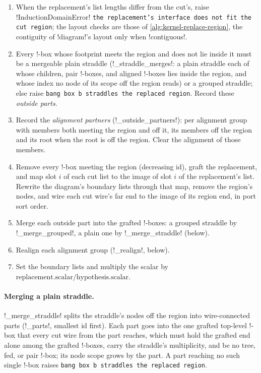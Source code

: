 \begin{algorithm}\label{alg:kernel-replace-cut}
\begin{enumerate}
\item When the replacement's list lengths differ from the cut's, raise \py!InductionDomainError! \texttt{the replacement's interface does not fit the cut region}; the layout checks are those of \cref{alg:kernel-replace-region}, the contiguity of \code!diagram!'s layout only when \code!contiguous!.
\item Every !-box whose footprint meets the region and does not lie inside it must be a mergeable plain straddle (\py!_straddle_merges!: a plain straddle each of whose children, pair !-boxes, and aligned !-boxes lies inside the region, and whose index no node of its scope off the region reads) or a grouped straddle; else raise \texttt{bang box b straddles the replaced region}. Record these \emph{outside parts}.
\item Record the \emph{alignment partners} (\py!_outside_partners!): per alignment group with members both meeting the region and off it, its members off the region and its root when the root is off the region. Clear the alignment of those members.
\item Remove every !-box meeting the region (decreasing id), graft the replacement, and map slot $i$ of each cut list to the image of slot $i$ of the replacement's list. Rewrite the diagram's boundary lists through that map, remove the region's nodes, and wire each cut wire's far end to the image of its region end, in port sort order.
\item Merge each outside part into the grafted !-boxes: a grouped straddle by \py!_merge_grouped!, a plain one by \py!_merge_straddle! (below).
\item Realign each alignment group (\py!_realign!, below).
\item Set the boundary lists and multiply the scalar by $\text{replacement.scalar}/\text{hypothesis.scalar}$.
\end{enumerate}
\end{algorithm}

\paragraph{Merging a plain straddle.} \py!_merge_straddle! splits the straddle's nodes off the region into wire-connected parts (\py!_parts!, smallest id first). Each part goes into the one grafted top-level !-box that every cut wire from the part reaches, which must hold the grafted end alone among the grafted !-boxes, carry the straddle's multiplicity, and be no tree, fed, or pair !-box; its node scope grows by the part. A part reaching no such single !-box raises \texttt{bang box b straddles the replaced region}.

